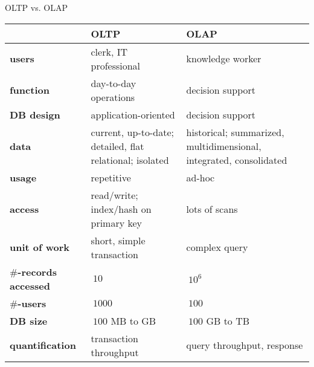 \documentclass[aspectratio=169,t]{beamer}
\begin{document}
  { 
    \begin{frame}{OLTP vs. OLAP}
      \begin{tabularx}{\textwidth}{|l|X|X|}
      & \textbf{OLTP} & \textbf{OLAP} \\\hline
      \textbf{users} & clerk, IT professional & knowledge worker \\
      \textbf{function} & day-to-day operations & decision support \\
      \textbf{DB design} & application-oriented & decision support \\
      \textbf{data} & current, up-to-date; detailed, flat relational; isolated & historical; summarized, multidimensional, integrated, consolidated \\
      \textbf{usage} & repetitive & ad-hoc \\
      \textbf{access} & read/write; index/hash on primary key & lots of scans \\
      \textbf{unit of work} & short, simple transaction & complex query \\
      \textbf{$\#$-records accessed} & $~ 10$ & $~ 10^6$ \\
      \textbf{$\#$-users} & $~ 1000$ & $~ 100$ \\
      \textbf{DB size} & $~ 100$ MB to GB & $~ 100$ GB to TB \\
      \textbf{quantification} & transaction throughput & query throughput, response \\
      \end{tabularx}
    \end{frame}
  }
\end{document}
